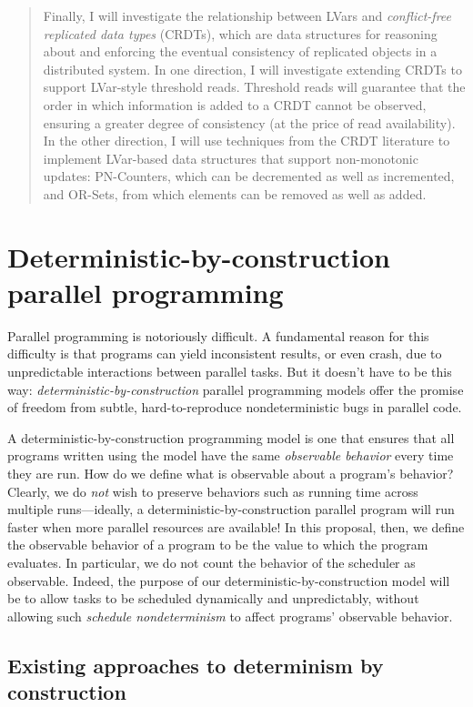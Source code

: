 \documentclass{article}
\begin{document}
\begin{abstract}
  Finally, I will investigate the relationship between LVars and
  \emph{conflict-free replicated data types} (CRDTs), which are data
  structures for reasoning about and enforcing the eventual
  consistency of replicated objects in a distributed system.  In one
  direction, I will investigate extending CRDTs to support LVar-style
  threshold reads.  Threshold reads will guarantee that the order in
  which information is added to a CRDT cannot be observed, ensuring a
  greater degree of consistency (at the price of read availability).
  In the other direction, I will use techniques from the CRDT
  literature to implement LVar-based data structures that support
  non-monotonic updates: PN-Counters, which can be decremented as well
  as incremented, and OR-Sets, from which elements can be removed as
  well as added.
\end{abstract}

\section{Deterministic-by-construction parallel programming}

Parallel programming is notoriously difficult.  
A fundamental reason for this difficulty is that programs can yield
inconsistent results, or even crash, due to unpredictable interactions
between parallel tasks.  But it doesn't have to be this way:
\emph{deterministic-by-construction} parallel programming models offer
the promise of freedom from subtle, hard-to-reproduce nondeterministic
bugs in parallel code.

A deterministic-by-construction programming model is one that ensures
that all programs written using the model have the same
\emph{observable behavior} every time they are run.  How do we define
what is observable about a program's behavior?  Clearly, we do
\emph{not} wish to preserve behaviors such as running time across
multiple runs---ideally, a deterministic-by-construction parallel
program will run faster when more parallel resources are available!
In this proposal, then, we define the observable behavior of a program
to be the value to which the program evaluates.  In particular, we do
not count the behavior of the scheduler as observable.  Indeed, the
purpose of our deterministic-by-construction model will be to allow
tasks to be scheduled dynamically and unpredictably, without allowing
such \emph{schedule nondeterminism} to affect programs' observable
behavior.

\subsection{Existing approaches to determinism by construction}
\end{document}

